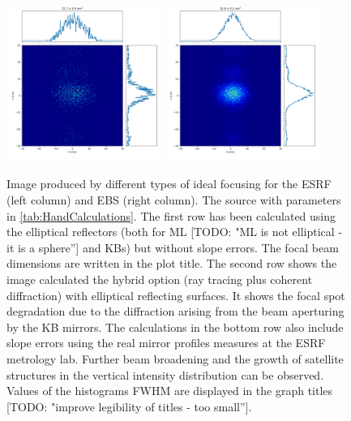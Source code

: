 \documentclass{iucr}              %
\newcommand{\todo}[1]{{\color{red}[TODO: "#1'']}}
\begin{document}
\begin{figure}
\includegraphics[width=0.45\textwidth]{GRAPHICS/hybriderrorsESRF.png}
\includegraphics[width=0.45\textwidth]{GRAPHICS/hybriderrorsEBS.png}
\caption{Image produced by different types of ideal focusing for the ESRF (left column) and EBS (right column). The source with parameters in 
\ref{tab:HandCalculations}. 
The first row has been calculated using the elliptical reflectors (both for ML \todo{ML is not elliptical - it is a sphere} and KBs) but without slope errors. The focal beam dimensions are written in the plot title.
The second row shows the image calculated the hybrid option (ray tracing plus coherent diffraction) with elliptical reflecting surfaces. It shows the focal spot degradation due to the diffraction arising from the beam aperturing by the KB mirrors. The calculations in the bottom row also include slope errors using the real mirror profiles measures at the ESRF metrology lab.  Further beam broadening and the growth of satellite structures in the vertical intensity distribution can be observed. Values of the histograms FWHM are displayed in the graph titles \todo{improve legibility of titles - too small}. 
}
\end{figure}
\end{document}
